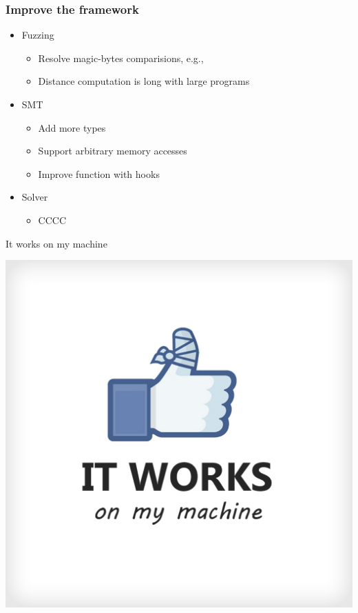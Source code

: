 \documentclass{beamer}
\begin{document}
\begin{frame}
\frametitle{Improve the framework}
\begin{itemize}
	\item Fuzzing
	\begin{itemize}
		\item Resolve magic-bytes comparisions, e.g., 
		\item Distance computation is long with large programs
	\end{itemize}
\item SMT
\begin{itemize}
	\item Add more types
	\item Support arbitrary memory accesses
	\item Improve function with hooks	
\end{itemize}
\item Solver
\begin{itemize}
	\item CCCC
\end{itemize}
\end{itemize}
\end{frame}
\begin{frame}{It works on my machine}
\begin{center}
	\includegraphics[height=\textheight]{Figures/Compilation}
\end{center}


\end{frame}
\end{document}
